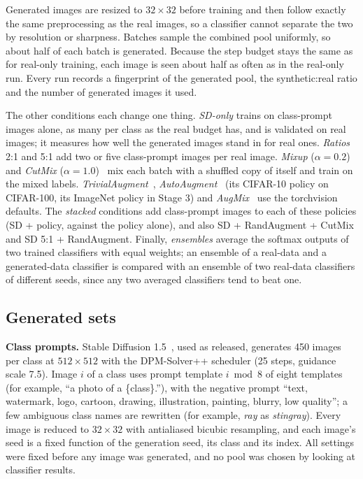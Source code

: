 Generated images are resized to $32\times32$ before training and then follow exactly the same preprocessing as the real images, so a classifier cannot separate the two by resolution or sharpness. Batches sample the combined pool uniformly, so about half of each batch is generated. Because the step budget stays the same as for real-only training, each image is seen about half as often as in the real-only run. Every run records a fingerprint of the generated pool, the synthetic:real ratio and the number of generated images it used.

The other conditions each change one thing. \textit{SD-only} trains on class-prompt images alone, as many per
class as the real budget has, and is validated on real images; it measures how well the generated images stand in
for real ones. \textit{Ratios} 2:1 and 5:1 add two or five class-prompt images per real image. \textit{Mixup}
($\alpha = 0.2$)~\cite{zhang2018mixup} and \textit{CutMix} ($\alpha = 1.0$)~\cite{yun2019cutmix} mix each batch
with a shuffled copy of itself and train on the mixed labels. \textit{TrivialAugment}~\cite{muller2021trivialaugment},
\textit{AutoAugment}~\cite{cubuk2019autoaugment} (its CIFAR-10 policy on CIFAR-100, its ImageNet policy in
Stage 3) and \textit{AugMix}~\cite{hendrycks2020augmix} use the torchvision defaults. The \textit{stacked}
conditions add class-prompt images to each of these policies (SD + policy, against the policy alone), and also
SD + RandAugment + CutMix and SD 5:1 + RandAugment. Finally, \textit{ensembles} average the softmax outputs of
two trained classifiers with equal weights; an ensemble of a real-data and a generated-data classifier is
compared with an ensemble of two real-data classifiers of different seeds, since any two averaged classifiers
tend to beat one.

\subsection{Generated sets}
\label{sec:generated-sets}
\textbf{Class prompts.} Stable Diffusion 1.5~\cite{rombach2022high}, used as released, generates 450 images per
class at $512\times512$ with the DPM-Solver++ scheduler (25 steps, guidance scale 7.5). Image $i$ of a class uses
prompt template $i \bmod 8$ of eight templates (for example, ``a photo of a \{class\}.''), with the negative
prompt ``text, watermark, logo, cartoon, drawing, illustration, painting, blurry, low quality''; a few ambiguous
class names are rewritten (for example, \textit{ray} as \textit{stingray}). Every image is reduced to $32\times32$
with antialiased bicubic resampling, and each image's seed is a fixed function of the generation seed, its class
and its index. All settings were fixed before any image was generated, and no pool was chosen by looking at
classifier results.

